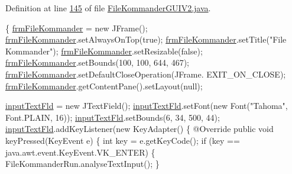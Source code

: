 Definition at line \hyperlink{L145}{145} of file \hyperlink{}{File\-Kommander\-G\-U\-I\-V2.\-java}.


\begin{DoxyCode}
                              \{
        \hyperlink{classcom_1_1poly_1_1nlp_1_1filekommander_1_1views_1_1_file_kommander_g_u_i_v2_a98fff3b4c6caac91d624b07beab03af5}{frmFileKommander} = \textcolor{keyword}{new} JFrame();
        \hyperlink{classcom_1_1poly_1_1nlp_1_1filekommander_1_1views_1_1_file_kommander_g_u_i_v2_a98fff3b4c6caac91d624b07beab03af5}{frmFileKommander}.setAlwaysOnTop(\textcolor{keyword}{true});
        \hyperlink{classcom_1_1poly_1_1nlp_1_1filekommander_1_1views_1_1_file_kommander_g_u_i_v2_a98fff3b4c6caac91d624b07beab03af5}{frmFileKommander}.setTitle(\textcolor{stringliteral}{"File Kommander"});
        \hyperlink{classcom_1_1poly_1_1nlp_1_1filekommander_1_1views_1_1_file_kommander_g_u_i_v2_a98fff3b4c6caac91d624b07beab03af5}{frmFileKommander}.setResizable(\textcolor{keyword}{false});
        \hyperlink{classcom_1_1poly_1_1nlp_1_1filekommander_1_1views_1_1_file_kommander_g_u_i_v2_a98fff3b4c6caac91d624b07beab03af5}{frmFileKommander}.setBounds(100, 100, 644, 467);
        \hyperlink{classcom_1_1poly_1_1nlp_1_1filekommander_1_1views_1_1_file_kommander_g_u_i_v2_a98fff3b4c6caac91d624b07beab03af5}{frmFileKommander}.setDefaultCloseOperation(JFrame.
      EXIT\_ON\_CLOSE);
        \hyperlink{classcom_1_1poly_1_1nlp_1_1filekommander_1_1views_1_1_file_kommander_g_u_i_v2_a98fff3b4c6caac91d624b07beab03af5}{frmFileKommander}.getContentPane().setLayout(null);

        \hyperlink{classcom_1_1poly_1_1nlp_1_1filekommander_1_1views_1_1_file_kommander_g_u_i_v2_a43db9456e6f586e8a7d59c86dc90cdc8}{inputTextFld} = \textcolor{keyword}{new} JTextField();
        \hyperlink{classcom_1_1poly_1_1nlp_1_1filekommander_1_1views_1_1_file_kommander_g_u_i_v2_a43db9456e6f586e8a7d59c86dc90cdc8}{inputTextFld}.setFont(\textcolor{keyword}{new} Font(\textcolor{stringliteral}{"Tahoma"}, Font.PLAIN, 16));
        \hyperlink{classcom_1_1poly_1_1nlp_1_1filekommander_1_1views_1_1_file_kommander_g_u_i_v2_a43db9456e6f586e8a7d59c86dc90cdc8}{inputTextFld}.setBounds(6, 34, 500, 44);
        \hyperlink{classcom_1_1poly_1_1nlp_1_1filekommander_1_1views_1_1_file_kommander_g_u_i_v2_a43db9456e6f586e8a7d59c86dc90cdc8}{inputTextFld}.addKeyListener(\textcolor{keyword}{new} KeyAdapter() \{
            @Override
            \textcolor{keyword}{public} \textcolor{keywordtype}{void} keyPressed(KeyEvent e) \{
                \textcolor{keywordtype}{int} key = e.getKeyCode();
                \textcolor{keywordflow}{if} (key == java.awt.event.KeyEvent.VK\_ENTER) \{
                    FileKommanderRun.analyseTextInput();
                \}


\end{DoxyCode}
